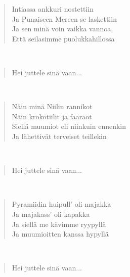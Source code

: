 \noindent\begin{minipage}{\linewidth}
\begin{verse}
	Intiassa ankkuri nostettiin\\
	Ja Punaiseen Mereen se laskettiin\\
	Ja sen minä voin vaikka vannoa,\\
	Että seilasimme puolukkahillossa\\
\end{verse}
\end{minipage}\\[10pt]
\noindent\begin{minipage}{\linewidth}
\begin{verse}
	Hei juttele sinä vaan...\\
\end{verse}
\end{minipage}\\[10pt]
\noindent\begin{minipage}{\linewidth}
\begin{verse}
	Näin minä Niilin rannikot\\
	Näin krokotiilit ja faaraot\\
	Siellä muumiot eli niinkuin ennenkin\\
	Ja lähettivät terveiset teillekin\\
\end{verse}
\end{minipage}\\[10pt]
\noindent\begin{minipage}{\linewidth}
\begin{verse}
	Hei juttele sinä vaan...\\
\end{verse}
\end{minipage}\\[10pt]
\noindent\begin{minipage}{\linewidth}
\begin{verse}
	Pyramiidin huipull' oli majakka\\
	Ja majakass' oli kapakka\\
	Ja siellä me kävimme ryypyllä\\
	Ja muumioitten kanssa hypyllä\\
\end{verse}
\end{minipage}\\[10pt]
\noindent\begin{minipage}{\linewidth}
\begin{verse}
	Hei juttele sinä vaan...\\
\end{verse}
\end{minipage}\\[10pt]
